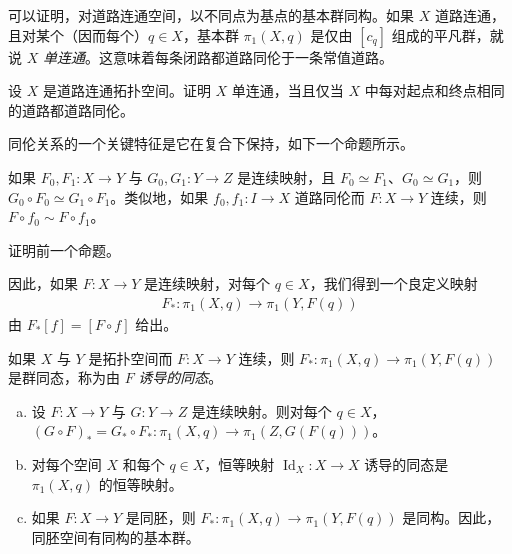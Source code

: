 \documentclass[../../main.tex]{subfiles}
\begin{document}
可以证明，对道路连通空间，以不同点为基点的基本群同构。如果 $X$ 道路连通，且对某个（因而每个）$q\in X$，基本群 $\pi_1(X,q)$ 是仅由 $[c_q]$ 组成的平凡群，就说 $X$ \emph{单连通}。这意味着每条闭路都道路同伦于一条常值道路。

\begin{exercise}\label{exercise:appA-A-61}
设 $X$ 是道路连通拓扑空间。证明 $X$ 单连通，当且仅当 $X$ 中每对起点和终点相同的道路都道路同伦。
\end{exercise}

同伦关系的一个关键特征是它在复合下保持，如下一个命题所示。

\begin{proposition}\label{proposition:appA-homotopy-composition}
如果 $F_0,F_1:X\to Y$ 与 $G_0,G_1:Y\to Z$ 是连续映射，且 $F_0\simeq F_1$、$G_0\simeq G_1$，则 $G_0\circ F_0\simeq G_1\circ F_1$。类似地，如果 $f_0,f_1:I\to X$ 道路同伦而 $F:X\to Y$ 连续，则 $F\circ f_0\sim F\circ f_1$。
\end{proposition}

\begin{exercise}\label{exercise:appA-A-63}
证明前一个命题。
\end{exercise}

因此，如果 $F:X\to Y$ 是连续映射，对每个 $q\in X$，我们得到一个良定义映射
\begin{align*}
F_*:\pi_1(X,q)\to\pi_1(Y,F(q))
\end{align*}
由 $F_*[f]=[F\circ f]$ 给出。

\begin{proposition}\label{proposition:appA-induced-hom}
如果 $X$ 与 $Y$ 是拓扑空间而 $F:X\to Y$ 连续，则 $F_*:\pi_1(X,q)\to\pi_1(Y,F(q))$ 是群同态，称为由 $F$ \emph{诱导的同态}。
\end{proposition}

\begin{proposition}[诱导同态的性质]\label{proposition:appA-induced-hom-properties}
\begin{enumerate}[(a)]
\item 设 $F:X\to Y$ 与 $G:Y\to Z$ 是连续映射。则对每个 $q\in X$，$(G\circ F)_*=G_*\circ F_*:\pi_1(X,q)\to\pi_1(Z,G(F(q)))$。
\item 对每个空间 $X$ 和每个 $q\in X$，恒等映射 $\operatorname{Id}_X:X\to X$ 诱导的同态是 $\pi_1(X,q)$ 的恒等映射。
\item 如果 $F:X\to Y$ 是同胚，则 $F_*:\pi_1(X,q)\to\pi_1(Y,F(q))$ 是同构。因此，同胚空间有同构的基本群。
\end{enumerate}
\end{proposition}
\end{document}
